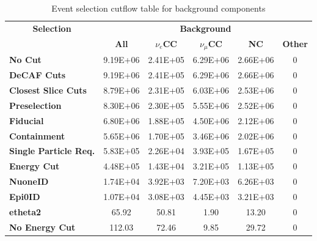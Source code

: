 \begin{table}[!hb]
\begin{tabular}{|l|ccccc|}\hline
\multicolumn{1}{|c|}{\multirow{2}{*}{\textbf{Selection}}} & \multicolumn{5}{c|}{\textbf{Background}}                                        \\
\multicolumn{1}{|c|}{}                                    & \textbf{All} & \textbf{$\nu_e$CC} & \textbf{$\nu_\mu$CC} & \textbf{NC} & \textbf{Other} \\\hline
\textbf{No Cut}                                         & 9.19E+06     & 2.41E+05       & 6.29E+06        & 2.66E+06    & 0              \\
\textbf{DeCAF Cuts}                                     & 9.19E+06     & 2.41E+05       & 6.29E+06        & 2.66E+06    & 0              \\
\textbf{Closest Slice Cuts}                             & 8.79E+06     & 2.31E+05       & 6.03E+06        & 2.53E+06    & 0              \\
\textbf{Preselection}                                   & 8.30E+06     & 2.30E+05       & 5.55E+06        & 2.52E+06    & 0              \\
\textbf{Fiducial}                                       & 6.80E+06     & 1.88E+05       & 4.50E+06        & 2.12E+06    & 0              \\
\textbf{Containment}                                    & 5.65E+06     & 1.70E+05       & 3.46E+06        & 2.02E+06    & 0              \\
\textbf{Single Particle Req.}                           & 5.83E+05     & 2.26E+04       & 3.93E+05        & 1.67E+05    & 0              \\
\textbf{Energy Cut}                                     & 4.48E+05     & 1.43E+04       & 3.21E+05        & 1.13E+05    & 0              \\
\textbf{NuoneID}                                        & 1.74E+04     & 3.92E+03       & 7.20E+03        & 6.26E+03    & 0              \\
\textbf{Epi0ID}                                         & 1.07E+04     & 3.08E+03       & 4.45E+03        & 3.21E+03    & 0              \\
\rowcolor[HTML]{67FD9A}
\textbf{etheta2}                                        & 65.92        & 50.81          & 1.90            & 13.20       & 0              \\\hline\hline
\textbf{No Energy Cut}                                  & 112.03       & 72.46          & 9.85            & 29.72       & 0   \\\hline
\end{tabular}
\caption{Event selection cutflow table for background components}
\label{tab:CutflowTableBackground}
\end{table}

